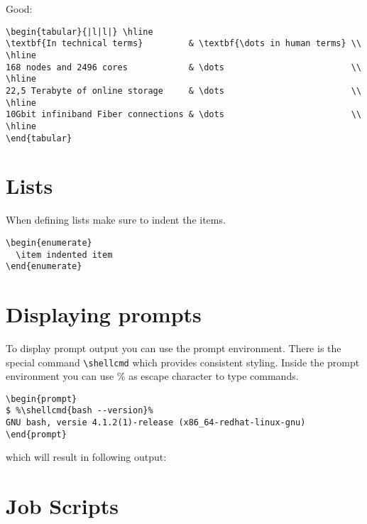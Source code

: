 \documentclass[11pt,a4paper,oneside]{book}
\newcommand{\shellcmd}[1]{\textbf{\texttt{\footnotesize #1}\\}}
\begin{document}
Good:
\begin{verbatim}
\begin{tabular}{|l|l|} \hline
\textbf{In technical terms}         & \textbf{\dots in human terms} \\ \hline
168 nodes and 2496 cores            & \dots                         \\ \hline
22,5 Terabyte of online storage     & \dots                         \\ \hline
10Gbit infiniband Fiber connections & \dots                         \\ \hline
\end{tabular}
\end{verbatim}

\section{Lists}
\label{sec:lists}

When defining lists make sure to indent the items.

\begin{verbatim}
\begin{enumerate}
  \item indented item
\end{enumerate}
\end{verbatim}

\section{Displaying prompts}
\label{sec:displaying-prompts}

To display prompt output you can use the prompt environment. There is the
special command \texttt{\textbackslash{}shellcmd{}} which provides consistent
styling. Inside the prompt environment you can use \% as escape character to
type commands.

\begin{verbatim}
\begin{prompt}
$ %\shellcmd{bash --version}%
GNU bash, versie 4.1.2(1)-release (x86_64-redhat-linux-gnu)
\end{prompt}
\end{verbatim}

which will result in following output:

\section{Job Scripts}
\label{sec:job-scripts}
\end{document}
